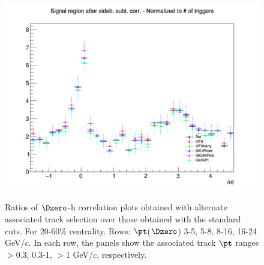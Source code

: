 \begin{figure}
{\includegraphics[width=0.31\linewidth]{figuresVsCent/Dzero/SystTrackEff/20_60/AzimCorrDistr_Dzero_Canvas_PtIntBins12to12_PoolInt_thr1to99_Superimp.png}} \\
 \caption{Ratios of $\Dzero$-h correlation plots obtained with alternate associated track selection over those obtained with the standard cuts. For 20-60\% centrality. Rows: $\pt$($\Dzero$) 3-5, 5-8, 8-16, 16-24 GeV/$c$. In each row, the panels show the associated track
$\pt$ ranges $> 0.3$, 0.3-1, $> 1$ GeV/$c$, respectively.}
\label{fig:SysTrEff2060}
\end{figure}
